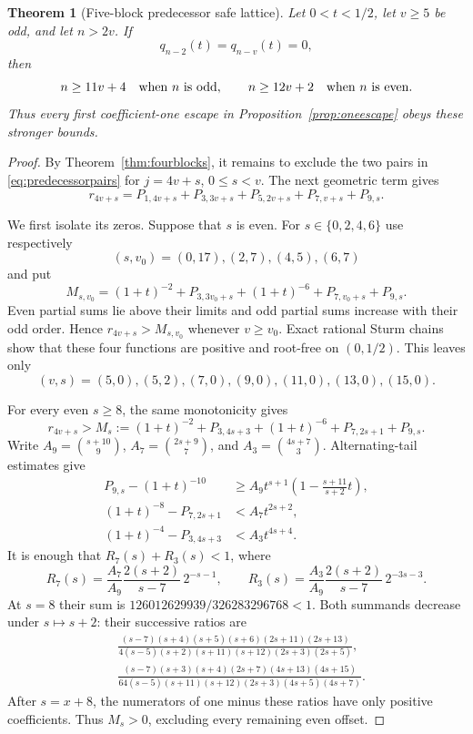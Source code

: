 \documentclass[11pt]{article}
\newtheorem{theorem}{Theorem}[section]
\theoremstyle{remark}
\numberwithin{equation}{section}
\begin{document}
\begin{theorem}[Five-block predecessor safe lattice]\label{thm:fiveblocks}
Let $0<t<1/2$, let $v\ge5$ be odd, and let $n>2v$.  If
\[
 q_{n-2}(t)=q_{n-v}(t)=0,
\]
then
\[
 n\ge11v+4\quad\hbox{when $n$ is odd},\qquad
 n\ge12v+2\quad\hbox{when $n$ is even}.
\]
Thus every first coefficient-one escape in Proposition~\ref{prop:oneescape}
obeys these stronger bounds.
\end{theorem}
\begin{proof}
By Theorem~\ref{thm:fourblocks}, it remains to exclude the two pairs in
\eqref{eq:predecessorpairs} for $j=4v+s$, $0\le s<v$.  The next geometric
term gives
\begin{equation}\label{eq:fiveblock}
 r_{4v+s}=P_{1,4v+s}+P_{3,3v+s}+P_{5,2v+s}
              +P_{7,v+s}+P_{9,s}.
\end{equation}

We first isolate its zeros.  Suppose that $s$ is even.  For
$s\in\{0,2,4,6\}$ use respectively
\[
 (s,v_0)=(0,17),(2,7),(4,5),(6,7)
\]
and put
\[
 M_{s,v_0}=(1+t)^{-2}+P_{3,3v_0+s}+(1+t)^{-6}
                         +P_{7,v_0+s}+P_{9,s}.
\]
Even partial sums lie above their limits and odd partial sums increase with
their odd order.  Hence $r_{4v+s}>M_{s,v_0}$ whenever $v\ge v_0$.
Exact rational Sturm chains show that these four functions are positive and
root-free on $(0,1/2)$.  This leaves only
\begin{equation}\label{eq:fiveblockevenexceptions}
 (v,s)=(5,0),(5,2),(7,0),(9,0),(11,0),(13,0),(15,0).
\end{equation}

For every even $s\ge8$, the same monotonicity gives
\[
 r_{4v+s}>M_s:=(1+t)^{-2}+P_{3,4s+3}+(1+t)^{-6}
                         +P_{7,2s+1}+P_{9,s}.
\]
Write $A_9={s+10\choose9}$, $A_7={2s+9\choose7}$, and
$A_3={4s+7\choose3}$.  Alternating-tail estimates give
\begin{align*}
 P_{9,s}-(1+t)^{-10}
 &\ge A_9t^{s+1}\left(1-\frac{s+11}{s+2}t\right),\\
 (1+t)^{-8}-P_{7,2s+1}&<A_7t^{2s+2},\\
 (1+t)^{-4}-P_{3,4s+3}&<A_3t^{4s+4}.
\end{align*}
It is enough that $R_7(s)+R_3(s)<1$, where
\[
 R_7(s)=\frac{A_7}{A_9}\frac{2(s+2)}{s-7}\,2^{-s-1},\qquad
 R_3(s)=\frac{A_3}{A_9}\frac{2(s+2)}{s-7}\,2^{-3s-3}.
\]
At $s=8$ their sum is $126012629939/326283296768<1$.  Both summands
decrease under $s\mapsto s+2$: their successive ratios are
\begin{align*}
 &\frac{(s-7)(s+4)(s+5)(s+6)(2s+11)(2s+13)}
 {4(s-5)(s+2)(s+11)(s+12)(2s+3)(2s+5)},\\
 &\frac{(s-7)(s+3)(s+4)(2s+7)(4s+13)(4s+15)}
 {64(s-5)(s+11)(s+12)(2s+3)(4s+5)(4s+7)}.
\end{align*}
After $s=x+8$, the numerators of one minus these ratios have only positive
coefficients.  Thus $M_s>0$, excluding every remaining even offset.


\end{proof}
\end{document}
